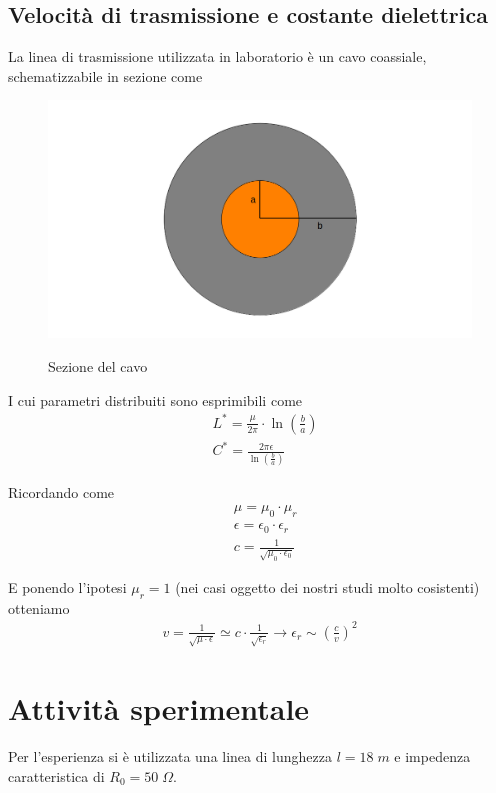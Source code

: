 \documentclass[a4paper,12pt]{report}
\begin{document}
\subsection{Velocità di trasmissione e costante dielettrica}
La linea di trasmissione utilizzata in laboratorio è un cavo coassiale, schematizzabile in sezione come
\begin{figure}[!htb]
	\centering
	\includegraphics[width=.7\textwidth]{pictures/cavo.png}
	\label{ergwg}
	\caption{\label{luegregegl} \small Sezione del cavo}
\end{figure}


I cui parametri distribuiti sono esprimibili come
\begin{align}
&L^* = \frac{\mu}{2\pi}\cdot \ln \left(\frac{b}{a}\right)\\
&C^* = \frac{2\pi \epsilon}{\ln \left(\frac{b}{a}\right)}
\end{align}

Ricordando come
\begin{align}
&\mu = \mu_0 \cdot \mu_r\\
&\epsilon = \epsilon_0 \cdot \epsilon_r\\
&c= \frac{1}{\sqrt{\mu_0 \cdot \epsilon_0}}
\end{align}

E ponendo l'ipotesi $\mu_r=1$ (nei casi oggetto dei nostri studi molto cosistenti) otteniamo
\begin{align}
v = \frac{1}{\sqrt{\mu \cdot \epsilon}} \simeq c \cdot \frac{1}{\sqrt{\epsilon_r}} \rightarrow \epsilon_r \sim \left(\frac{c}{v} \right)^2
\end{align}

\newpage

\section{Attività sperimentale}

Per l'esperienza si è utilizzata una linea di lunghezza $l= 18 \; m$ e impedenza caratteristica di $R_0= 50 \; \Omega$.
\end{document}
